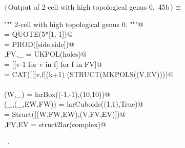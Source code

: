 \documentclass[11pt,oneside]{article}	%
\begin{document}
\begin{flushleft} \small \label{scrap75}
\protect{}$\langle\,$Output of 2-cell with high topological genus 0.\nobreak\ {\footnotesize 45b}$\,\rangle\equiv$
\vspace{-1ex}
\begin{list}{}{} \item
\mbox{}\verb@""" 2-cell with high topological genus 0. """@\\
\mbox{}\verb@side = QUOTE(5*[1,-1])@\\
\mbox{}\verb@holes = PROD([side,side])@\\
\mbox{}\verb@V,FV,_ = UKPOL(holes)@\\
\mbox{}\verb@FV = [[v-1 for v in f] for f in FV]@\\
\mbox{}\verb@EV = CAT([[[v,f[(k+1)%4]] for k,v in enumerate(f+[f[0]][:-1])] for f in FV])@\\
\mbox{}\verb@VIEW(STRUCT(MKPOLS((V,EV))))@\\
\mbox{}\verb@@\\
\mbox{}\verb@(W,_) = larBox((-1,-1),(10,10))@\\
\mbox{}\verb@(_,(_,EW,FW)) = larCuboids((1,1),True)@\\
\mbox{}\verb@complex = Struct([(W,FW,EW),(V,FV,EV)])@\\
\mbox{}\verb@V,FV,EV = struct2lar(complex)@\\
\mbox{}\verb@@{\NWsep}
\end{list}
\vspace{-1ex}
\footnotesize\addtolength{\baselineskip}{-1ex}
\begin{list}{}{\setlength{\itemsep}{-\parsep}\setlength{\itemindent}{-\leftmargin}}
\item \NWtxtMacroRefIn\ .
\end{list}
\end{flushleft}
\end{document}
